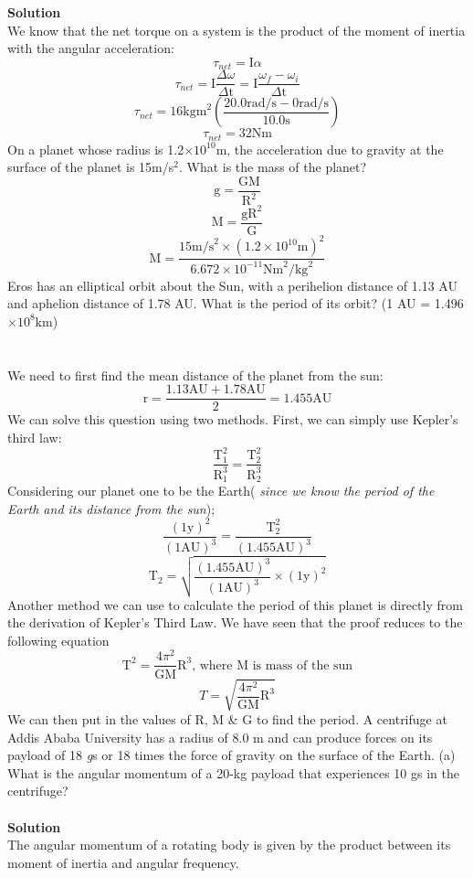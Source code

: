\documentclass[9pt,addpoints]{exam}
\begin{document}
\begin{questions}
		\textbf{Solution} \\
		We know that the net torque on a system is the product of the moment of inertia with the angular acceleration:
		$$\tau_{net}=\text{I}\alpha$$
		$$\tau_{net}=\text{I}\dfrac{\varDelta\omega}{\varDelta\text{t}}=\text{I}\dfrac{\omega_f-\omega_i}{\varDelta\text{t}}$$
		$$\tau_{net}=16\text{kgm}^2(\dfrac{20.0\text{rad/s}-0\text{rad/s}}{10.0\text{s}})$$
		$$\tau_{net}=32\text{Nm}$$	
		\question On a planet whose radius is  1.2$\times10^{10}$m, the acceleration due to gravity at the surface of the planet is  15m/s$^2$. What is the mass of the planet?
		$$\text{g}=\dfrac{\text{GM}}{\text{R}^2}$$
		$$\text{M}=\dfrac{\text{gR}^2}{\text{G}}$$
		$$\text{M}=\dfrac{15\text{m/s}^2\times(1.2\times10^{10}\text{m})^2}{6.672\times10^{-11}\text{Nm}^2/\text{kg}^2}$$	
		\question Eros has an elliptical orbit about the Sun, with a perihelion distance of 1.13 AU and aphelion distance of 1.78 AU. What is the period of its orbit? (1 AU = 1.496$\times10^8$km) \\ \\
		 \\
		We need to first find the mean distance of the planet from the sun:
		$$\text{r}=\dfrac{1.13\text{AU}+1.78\text{AU}}{2}=1.455\text{AU}$$
		We can solve this question using two methods. First, we can simply use Kepler's third law:
		$$\dfrac{\text{T}_1^2}{\text{R}_1^3}=\dfrac{\text{T}_2^2}{\text{R}_2^3}$$ 
		Considering our planet one to be the Earth( \textit{since we know the period of the Earth and its distance from the sun});
		$$\dfrac{(1 \text{y})^2}{(1 \text{AU})^3}=\dfrac{\text{T}_2^2}{(1.455\text{AU})^3}$$
		$$\text{T}_2=\sqrt{\dfrac{(1.455\text{AU})^3}{(1\text{AU})^3}\times(1\text{y})^2}$$
		Another method we can use to calculate the period of this planet is directly from the derivation of Kepler's Third Law. We have seen that the proof reduces to the following equation
		$$\text{T}^2=\dfrac{4\pi^2}{\text{GM}}\text{R}^3\text{, where M is mass of the sun}$$
		$$T=\sqrt{\dfrac{4\pi^2}{\text{GM}}\text{R}^3}$$
		We can then put in the values of R, M  \& G to find the period.
		\question A centrifuge at Addis Ababa University has a radius of 8.0 m and can produce forces on its payload of 18 \textit{g}s or 18 times the force of gravity on  the surface of the Earth. (a) What is the angular momentum of a 20-kg payload that experiences 10 gs in the centrifuge?\\ \\
		\textbf{Solution} \\
		The angular momentum of a rotating body is given by the product between its moment of inertia and angular frequency.

\end{questions}
\end{document}
